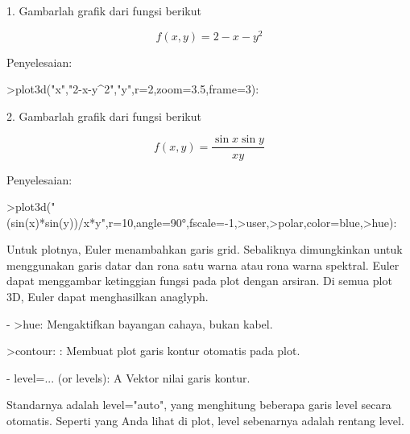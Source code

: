 \documentclass{article}
\begin{document}
\begin{eulernotebook}
\begin{eulercomment}
1. Gambarlah grafik dari fungsi berikut\\
\end{eulercomment}
\begin{eulerformula}
\[
f(x,y)=2-x-y^2
\]
\end{eulerformula}
\begin{eulercomment}
Penyelesaian:
\end{eulercomment}
\begin{eulerprompt}
>plot3d("x","2-x-y^2","y",r=2,zoom=3.5,frame=3):
\end{eulerprompt}
\begin{eulercomment}
2. Gambarlah grafik dari fungsi berikut\\
\end{eulercomment}
\begin{eulerformula}
\[
f(x,y)=\frac{\sin{x}\sin{y}}{xy}
\]
\end{eulerformula}
\begin{eulercomment}
Penyelesaian:
\end{eulercomment}
\begin{eulerprompt}
>plot3d("(sin(x)*sin(y))/x*y",r=10,angle=90°,fscale=-1,>user,>polar,color=blue,>hue):
\end{eulerprompt}
\begin{eulercomment}
Untuk plotnya, Euler menambahkan garis grid. Sebaliknya dimungkinkan
untuk menggunakan garis datar dan rona satu warna atau rona warna
spektral. Euler dapat menggambar ketinggian fungsi pada plot dengan
arsiran. Di semua plot 3D, Euler dapat menghasilkan anaglyph.

- \textgreater{}hue:  Mengaktifkan bayangan cahaya, bukan kabel.

\end{eulercomment}
\begin{eulerttcomment}
 >contour: : Membuat plot garis kontur otomatis pada plot.
\end{eulerttcomment}
\begin{eulercomment}
- level=... (or levels): A Vektor nilai garis kontur.

Standarnya adalah level="auto", yang menghitung beberapa garis level
secara otomatis. Seperti yang Anda lihat di plot, level sebenarnya
adalah rentang level.


\end{eulercomment}
\end{eulernotebook}
\end{document}
